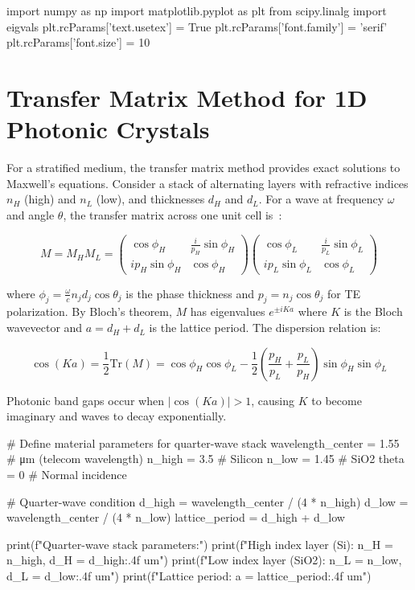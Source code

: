 \documentclass[11pt,a4paper]{article}
\begin{document}
\begin{pycode}
import numpy as np
import matplotlib.pyplot as plt
from scipy.linalg import eigvals
plt.rcParams['text.usetex'] = True
plt.rcParams['font.family'] = 'serif'
plt.rcParams['font.size'] = 10
\end{pycode}

\section{Transfer Matrix Method for 1D Photonic Crystals}

For a stratified medium, the transfer matrix method provides exact solutions to Maxwell's equations. Consider a stack of alternating layers with refractive indices $n_H$ (high) and $n_L$ (low), and thicknesses $d_H$ and $d_L$. For a wave at frequency $\omega$ and angle $\theta$, the transfer matrix across one unit cell is~\cite{Yeh1988}:

\begin{equation}
M = M_H M_L = \begin{pmatrix}
\cos\phi_H & \frac{i}{p_H}\sin\phi_H \\
ip_H\sin\phi_H & \cos\phi_H
\end{pmatrix}
\begin{pmatrix}
\cos\phi_L & \frac{i}{p_L}\sin\phi_L \\
ip_L\sin\phi_L & \cos\phi_L
\end{pmatrix}
\end{equation}

where $\phi_j = \frac{\omega}{c} n_j d_j \cos\theta_j$ is the phase thickness and $p_j = n_j\cos\theta_j$ for TE polarization. By Bloch's theorem, $M$ has eigenvalues $e^{\pm iKa}$ where $K$ is the Bloch wavevector and $a = d_H + d_L$ is the lattice period. The dispersion relation is:

\begin{equation}
\cos(Ka) = \frac{1}{2}\text{Tr}(M) = \cos\phi_H\cos\phi_L - \frac{1}{2}\left(\frac{p_H}{p_L} + \frac{p_L}{p_H}\right)\sin\phi_H\sin\phi_L
\end{equation}

Photonic band gaps occur when $|\cos(Ka)| > 1$, causing $K$ to become imaginary and waves to decay exponentially.

\begin{pycode}
# Define material parameters for quarter-wave stack
wavelength_center = 1.55  # μm (telecom wavelength)
n_high = 3.5  # Silicon
n_low = 1.45  # SiO2
theta = 0  # Normal incidence

# Quarter-wave condition
d_high = wavelength_center / (4 * n_high)
d_low = wavelength_center / (4 * n_low)
lattice_period = d_high + d_low

print(f"Quarter-wave stack parameters:")
print(f"High index layer (Si): n_H = {n_high}, d_H = {d_high:.4f} um")
print(f"Low index layer (SiO2): n_L = {n_low}, d_L = {d_low:.4f} um")
print(f"Lattice period: a = {lattice_period:.4f} um")
\end{pycode}
\end{document}
